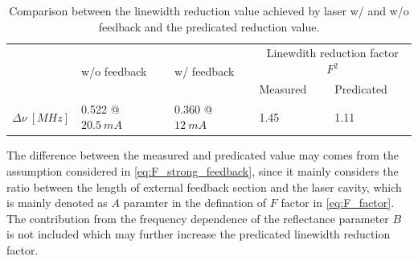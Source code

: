 
\begin{table}[]
    \centering
    \caption{Comparison between the linewidth reduction value achieved by laser w/ and w/o feedback and the predicated reduction value.}
    \label{tab:linewidth_comparision}
    \begin{tabular}{@{}lllll@{}}
    \toprule
    \multirow{2}{*}{} & \multirow{2}{*}{w/o feedback} & \multirow{2}{*}{w/ feedback} & \multicolumn{2}{c}{Linewdith reduction factor $F^2$} \\
                      &                               &                              & Measured               & Predicated               \\ \midrule
    $\Delta\nu \ [MHz]$ & 0.522 @ $20.5 \ mA$              & 0.360 @ $12 \ mA$              & 1.45                     & 1.11                     \\ \bottomrule
    \end{tabular}
\end{table}

The difference between the measured and predicated value may comes from the assumption considered in \autoref{eq:F_strong_feedback}, since it mainly considers the ratio between the length of external feedback section and the laser cavity, which is mainly denoted as $A$ paramter in the defination of $F$ factor in \autoref{eq:F_factor}. The contribution from the frequency dependence of the reflectance parameter $B$ is not included which may further increase the predicated linewidth reduction factor.

